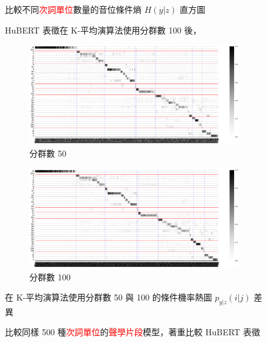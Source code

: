 {\begin{figure}
            \caption{HuBERT 表徵在 K-平均演算法使用分群數 100 後，}
            比較不同\textcolor{red}{次詞單位}數量的音位條件熵 $H(y|z)$ 直方圖
            \label{fig:hub-u100-hist-comparisons}
        \end{figure}
    }

    {
        \begin{figure}
             \centering
             \begin{subfigure}{\textwidth}
                 \centering
                 \includegraphics[width=1\linewidth]{figures/ch4figs/hub-u050-ap0500-givenunit-byphn.png}
                 \caption{分群數 50}
                 \label{subfig:hub-u050-ap0500-givenunit-byphn--picked}
             \end{subfigure}
             \vfill
             \begin{subfigure}{\textwidth}
                 \centering
                 \includegraphics[width=1\linewidth]{figures/ch4figs/hub-u050-ap1000-givenunit-byphn.png}
                 \caption{分群數 100}
                 \label{subfig:hub-u100-ap0500-givenunit-byphn--picked}
             \end{subfigure}
             \caption{比較同樣 500 種\textcolor{red}{次詞單位}的\textcolor{red}{聲學片段}模型，著重比較 HuBERT 表徵}
             在 K-平均演算法使用分群數 50 與 100 的條件機率熱圖 $p_{y|z}(i|j)$ 差異
             \label{fig:check-ap0500}
        \end{figure}
    }

